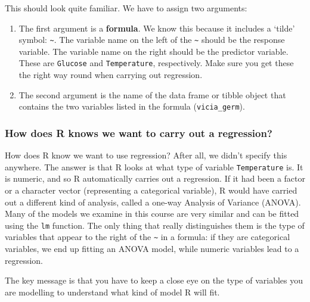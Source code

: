 \documentclass[
]{book}
\newenvironment{greybox}{
  \definecolor{shadecolor}{rgb}{0.95,0.95,0.95}  %
  \color{black}
  \begin{shaded}}
 {\end{shaded}}
\newenvironment{infobox}[1]
  {
  \begin{itemize}
  \renewcommand{\labelitemi}{
    \raisebox{-.7\height}[0pt][0pt]{
      {\setkeys{Gin}{width=3em,keepaspectratio}
        \texttt{[image: images/\#1]}}
    }
  }
  \setlength{\fboxsep}{1em}
  \begin{greybox}
  \item
  }
  {
  \end{greybox}
  \end{itemize}
  }
\begin{document}
This should look quite familiar. We have to assign two arguments:

\begin{enumerate}
\def\labelenumi{\arabic{enumi}.}
\item
  The first argument is a \textbf{formula}. We know this because it includes a `tilde' symbol: \texttt{\textasciitilde{}}. The variable name on the left of the \texttt{\textasciitilde{}} should be the response variable. The variable name on the right should be the predictor variable. These are \texttt{Glucose} and \texttt{Temperature}, respectively. Make sure you get these the right way round when carrying out regression.
\item
  The second argument is the name of the data frame or tibble object that contains the two variables listed in the formula (\texttt{vicia\_germ}).
\end{enumerate}

\begin{infobox}{information}

\hypertarget{how-does-r-knows-we-want-to-carry-out-a-regression}{%
\subsubsection*{How does R knows we want to carry out a regression?}\label{how-does-r-knows-we-want-to-carry-out-a-regression}}

How does R know we want to use regression? After all, we didn't specify this anywhere. The answer is that R looks at what type of variable \texttt{Temperature} is. It is numeric, and so R automatically carries out a regression. If it had been a factor or a character vector (representing a categorical variable), R would have carried out a different kind of analysis, called a one-way Analysis of Variance (ANOVA). Many of the models we examine in this course are very similar and can be fitted using the \texttt{lm} function. The only thing that really distinguishes them is the type of variables that appear to the right of the \texttt{\textasciitilde{}} in a formula: if they are categorical variables, we end up fitting an ANOVA model, while numeric variables lead to a regression.

The key message is that you have to keep a close eye on the type of variables you are modelling to understand what kind of model R will fit.

\end{infobox}
\end{document}
